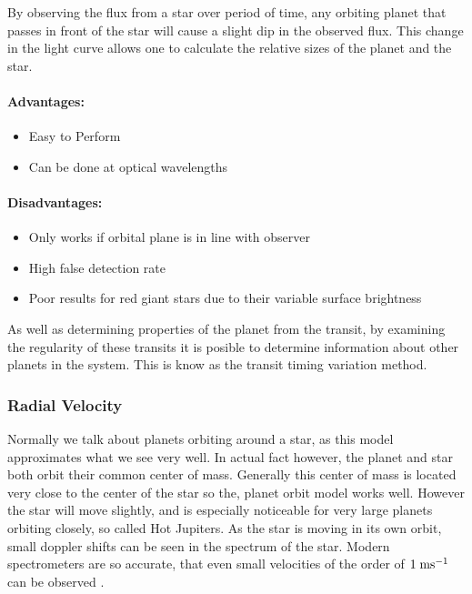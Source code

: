 By observing the flux from a star over period of time, any orbiting planet that passes in front of the star will cause a slight dip in the observed flux. This change in the light curve allows one to calculate the relative sizes of the planet and the star.

\paragraph{Advantages:}
\begin{itemize}
    \item Easy to Perform
    \item Can be done at optical wavelengths
\end{itemize}

\paragraph{Disadvantages:}
\begin{itemize}
    \item Only works if orbital plane is in line with observer
    \item High false detection rate \cite{santerne2012sophie}
    \item Poor results for red giant stars due to their variable surface brightness
\end{itemize}

As well as determining properties of the planet from the transit, by examining the regularity of these transits it is posible to determine information about other planets in the system. This is know as the transit timing variation method.

\subsubsection{Radial Velocity}

Normally we talk about planets orbiting around a star, as this model approximates what we see very well. In actual fact however, the planet and star both orbit their common center of mass. Generally this center of mass is located very close to the center of the star so the, planet orbit model works well. However the star will move slightly, and is especially noticeable for very large planets orbiting closely, so called Hot Jupiters. As the star is moving in its own orbit, small doppler shifts can be seen in the spectrum of the star. Modern spectrometers are so accurate, that even small velocities of the order of $1\;\mathrm{ms^{-1}}$ can be observed \cite{ge2002externally}.

